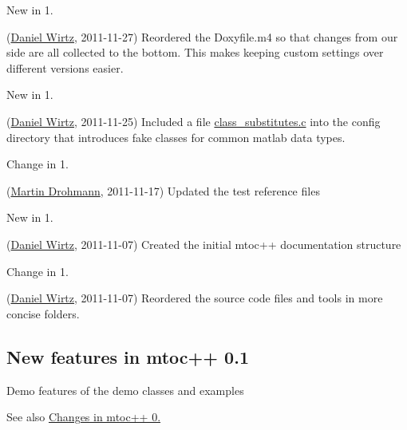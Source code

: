\begin{DoxyRefDesc}{New in 1.}
\item[\hyperlink{newfeat1_2__newfeat1_2000003}{New in 1.\+2}](\hyperlink{developers_dw}{Daniel Wirtz}, 2011-\/11-\/27) Reordered the Doxyfile.\+m4 so that changes from our side are all collected to the bottom. This makes keeping custom settings over different versions easier.\end{DoxyRefDesc}


\begin{DoxyRefDesc}{New in 1.}
\item[\hyperlink{newfeat1_2__newfeat1_2000004}{New in 1.\+2}](\hyperlink{developers_dw}{Daniel Wirtz}, 2011-\/11-\/25) Included a file \hyperlink{class__substitutes_8c_source}{class\+\_\+substitutes.\+c} into the config directory that introduces fake classes for common matlab data types.\end{DoxyRefDesc}


\begin{DoxyRefDesc}{Change in 1.}
\item[\hyperlink{changelog1_2__changelog1_2000010}{Change in 1.\+2}](\hyperlink{developers_md}{Martin Drohmann}, 2011-\/11-\/17) Updated the test reference files\end{DoxyRefDesc}


\begin{DoxyRefDesc}{New in 1.}
\item[\hyperlink{newfeat1_2__newfeat1_2000005}{New in 1.\+2}](\hyperlink{developers_dw}{Daniel Wirtz}, 2011-\/11-\/07) Created the initial mtoc++ documentation structure\end{DoxyRefDesc}


\begin{DoxyRefDesc}{Change in 1.}
\item[\hyperlink{changelog1_2__changelog1_2000011}{Change in 1.\+2}](\hyperlink{developers_dw}{Daniel Wirtz}, 2011-\/11-\/07) Reordered the source code files and tools in more concise folders.\end{DoxyRefDesc}
\hypertarget{newfeat0_1}{}\subsection{New features in mtoc++ 0.1}\label{newfeat0_1}
Demo features of the demo classes and examples

See also \hyperlink{changelog0_1}{Changes in mtoc++ 0.}


